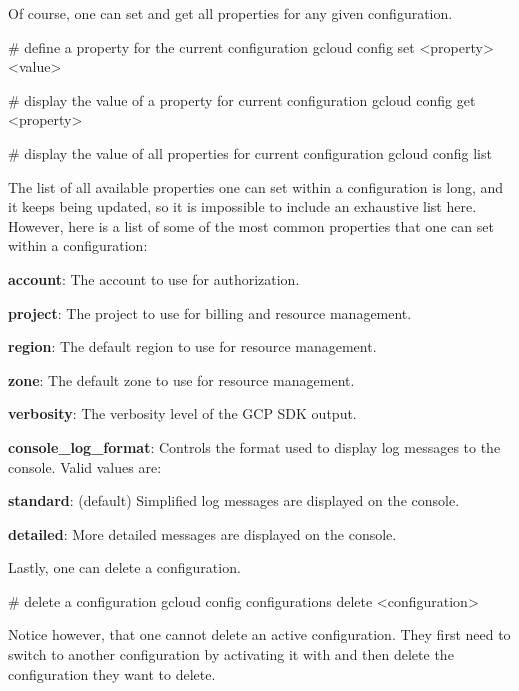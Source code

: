 Of course, one can set and get all properties for any given configuration.

\begin{bash}
# define a property for the current configuration
gcloud config set <property> <value>
\end{bash}

\begin{bash}
# display the value of a property for current configuration
gcloud config get <property>
\end{bash}

\begin{bash}
# display the value of all properties for current configuration
gcloud config list
\end{bash}

The list of all available properties one can set within a configuration is long, and it keeps being updated, so it is
impossible to include an exhaustive list here. However, here is a list of some of the most common properties that one
can set within a configuration:
\bit
\item \textbf{account}: The account to use for authorization.
\item \textbf{project}: The project to use for billing and resource management.
\item \textbf{region}: The default region to use for resource management.
\item \textbf{zone}: The default zone to use for resource management.
\item \textbf{verbosity}: The verbosity level of the GCP SDK output.
\item \textbf{console\_log\_format}: Controls the format used to display log messages to the console. Valid values are:
    \bit
    \item \textbf{standard}: (default) Simplified log messages are displayed on the console.
    \item \textbf{detailed}: More detailed messages are displayed on the console.
    \eit
\eit

Lastly, one can delete a configuration.

\begin{bash}
# delete a configuration
gcloud config configurations delete <configuration>
\end{bash}

Notice however, that one cannot delete an active configuration. They first need to switch to another configuration by
activating it with  and then delete the configuration they want to delete.

